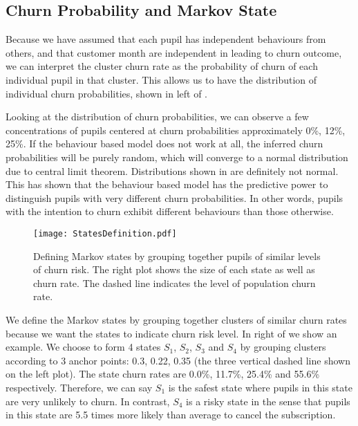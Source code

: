 \documentclass[english,a4,oneside,9pt]{extarticle}
\begin{document}
\subsection*{Churn Probability and Markov State}

Because we have assumed that each pupil has independent behaviours from others, and that customer month are independent in leading to churn outcome, we can interpret the cluster churn rate as the probability of churn of each individual pupil in that cluster. This allows us to have the distribution of individual churn probabilities, shown in left of .

Looking at the distribution of churn probabilities, we can observe a few concentrations of pupils centered at churn probabilities approximately 0\%, 12\%, 25\%. If the behaviour based model does not work at all, the inferred churn probabilities will be purely random, which will converge to a normal distribution due to central limit theorem. Distributions shown in  are definitely not normal. This has shown that the behaviour based model has the predictive power to distinguish pupils with very different churn probabilities. In other words, pupils with the intention to churn exhibit different behaviours than those otherwise.

\begin{figure}[htb]
\vspace*{-3mm}
\centering
\texttt{[image: StatesDefinition.pdf]}
\caption{Defining Markov states by grouping together pupils of similar levels of churn risk. The right plot shows the size of each state as well as churn rate. The dashed line indicates the level of population churn rate.}
\vspace*{-2mm}
\label{fig:state}
\end{figure}

We define the Markov states by grouping together clusters of similar churn rates because we want the states to indicate churn risk level. In right of  we show an example. We choose to form 4 states $S_1$, $S_2$, $S_3$ and $S_4$ by grouping clusters according to 3 anchor points: 0.3, 0.22, 0.35 (the three vertical dashed line shown on the left plot). The state churn rates are 0.0\%, 11.7\%, 25.4\% and 55.6\% respectively. Therefore, we can say $S_1$ is the safest state where pupils in this state are very unlikely to churn. In contrast, $S_4$ is a risky state in the sense that pupils in this state are 5.5 times more likely than average to cancel the subscription.
\end{document}
